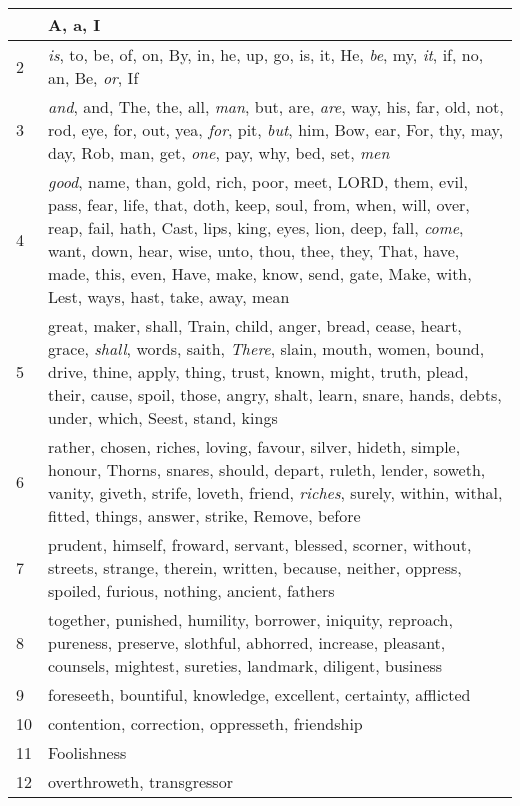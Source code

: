 \begin{center}
\begin{longtable}{l|p{3.75in}}
\hline \hline 
\endlastfoot 
1 & A, a, I\\ \hline 
2 & \emph{is}, to, be, of, on, By, in, he, up, go, is, it, He, \emph{be}, my, \emph{it}, if, no, an, Be, \emph{or}, If\\ \hline 
3 & \emph{and}, and, The, the, all, \emph{man}, but, are, \emph{are}, way, his, far, old, not, rod, eye, for, out, yea, \emph{for}, pit, \emph{but}, him, Bow, ear, For, thy, may, day, Rob, man, get, \emph{one}, pay, why, bed, set, \emph{men}\\ \hline 
4 & \emph{good}, name, than, gold, rich, poor, meet, LORD, them, evil, pass, fear, life, that, doth, keep, soul, from, when, will, over, reap, fail, hath, Cast, lips, king, eyes, lion, deep, fall, \emph{come}, want, down, hear, wise, unto, thou, thee, they, That, have, made, this, even, Have, make, know, send, gate, Make, with, Lest, ways, hast, take, away, mean\\ \hline 
5 & great, maker, shall, Train, child, anger, bread, cease, heart, grace, \emph{shall}, words, saith, \emph{There}, slain, mouth, women, bound, drive, thine, apply, thing, trust, known, might, truth, plead, their, cause, spoil, those, angry, shalt, learn, snare, hands, debts, under, which, Seest, stand, kings\\ \hline 
6 & rather, chosen, riches, loving, favour, silver, hideth, simple, honour, Thorns, snares, should, depart, ruleth, lender, soweth, vanity, giveth, strife, loveth, friend, \emph{riches}, surely, within, withal, fitted, things, answer, strike, Remove, before\\ \hline 
7 & prudent, himself, froward, servant, blessed, scorner, without, streets, strange, therein, written, because, neither, oppress, spoiled, furious, nothing, ancient, fathers\\ \hline 
8 & together, punished, humility, borrower, iniquity, reproach, pureness, preserve, slothful, abhorred, increase, pleasant, counsels, mightest, sureties, landmark, diligent, business\\ \hline 
9 & foreseeth, bountiful, knowledge, excellent, certainty, afflicted\\ \hline 
10 & contention, correction, oppresseth, friendship\\ \hline 
11 & Foolishness\\ \hline 
12 & overthroweth, transgressor\\ \hline 
\end{longtable} 
\end{center} 




 
